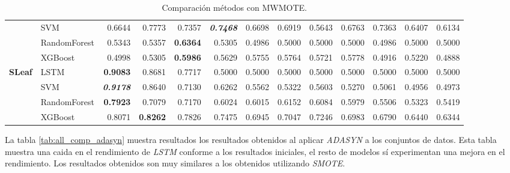 \begin{table}[H]
\begin{adjustbox}{max width=14cm}
\begin{tabular}{|c|l|r|r|r|r|r|r|r|r|r|r|r|}
			                      & SVM          & 0.6644                   & 0.7773          & 0.7357                   & \textit{\textbf{0.7468}} & 0.6698          & 0.6919                   & 0.5643 & 0.6763 & 0.7363                   & 0.6407          & 0.6134          \\
			                      & RandomForest & 0.5343                   & 0.5357          & \textbf{0.6364}          & 0.5305                   & 0.4986          & 0.5000                   & 0.5000 & 0.5000 & 0.4986                   & 0.5000          & 0.5000          \\
			                      & XGBoost      & 0.4998                   & 0.5305          & \textbf{0.5986}          & 0.5629                   & 0.5755          & 0.5764                   & 0.5721 & 0.5778 & 0.4916                   & 0.5220          & 0.4888          \\
			\hline
			\textbf{SLeaf}        & LSTM         & \textbf{0.9083}          & 0.8681          & 0.7717                   & 0.5000                   & 0.5000          & 0.5000                   & 0.5000 & 0.5000 & 0.5000                   & 0.5000          & 0.5000          \\
			                      & SVM          & \textit{\textbf{0.9178}} & 0.8640          & 0.7130                   & 0.6262                   & 0.5562          & 0.5322                   & 0.5603 & 0.5270 & 0.5061                   & 0.4956          & 0.4973          \\
			                      & RandomForest & \textbf{0.7923}          & 0.7079          & 0.7170                   & 0.6024                   & 0.6015          & 0.6152                   & 0.6084 & 0.5979 & 0.5506                   & 0.5323          & 0.5419          \\
			                      & XGBoost      & 0.8071                   & \textbf{0.8262} & 0.7826                   & 0.7475                   & 0.6945          & 0.7047                   & 0.7246 & 0.6983 & 0.6790                   & 0.6440          & 0.6344          \\
			\hline
		\end{tabular}
	\end{adjustbox}
	\caption{Comparación métodos con MWMOTE.}
	\label{tab:all_comp_mwmote}
\end{table}

La tabla \ref{tab:all_comp_adasyn} muestra resultados los resultados obtenidos al aplicar \textit{ADASYN} a los conjuntos de datos. Esta tabla muestra una caida en el rendimiento de \textit{LSTM} conforme a los resultados iniciales, el resto de modelos sí experimentan una mejora en el rendimiento. Los resultados obtenidos son muy similares a los obtenidos utilizando \textit{SMOTE}.\newline

